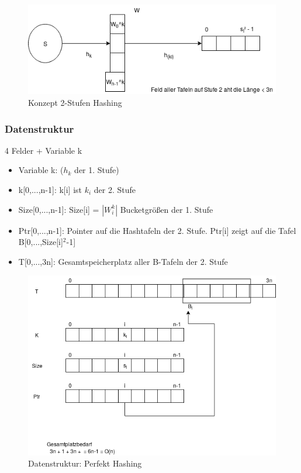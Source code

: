 \begin{figure}[h]
    \begin{center}
        \includegraphics[width=15cm]{2stufenhashing.png}
        \caption{Konzept 2-Stufen Hashing}
        \label{fig:}
    \end{center}
\end{figure}


\subsubsection{Datenstruktur} 4 Felder + Variable k
\begin{itemize}
    \item Variable k: ($ h_k $ der 1. Stufe)
    \item k[0,...,n-1]: k[i] ist $ k_i $ der 2. Stufe
    \item Size[0,...,n-1]: Size[i] = $ |W_i^k| $ Bucketgrößen der 1. Stufe
    \item Ptr[0,...,n-1]: Pointer auf die Hashtafeln der 2. Stufe. Ptr[i] zeigt auf die Tafel B[0,...,Size[i]$^2$-1]
    \item T[0,...,3n]: Gesamtspeicherplatz aller B-Tafeln der 2. Stufe
\end{itemize} 

\begin{figure}[h]
    \begin{center}
        \includegraphics[width=15cm]{datenstruktur.png}
        \caption{Datenstruktur: Perfekt Hashing}
        \label{fig:}
    \end{center}
\end{figure}

